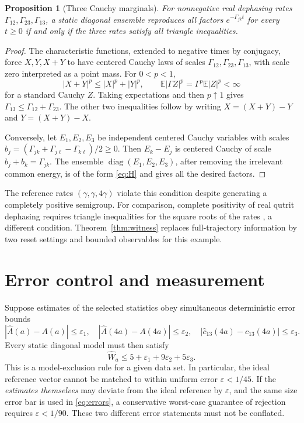 \documentclass[11pt,a4paper]{article}
\newtheorem{proposition}[theorem]{Proposition}
\newcommand{\E}{\mathbb E}
\newcommand{\diag}{\operatorname{diag}}
\begin{document}
\begin{proposition}[Three Cauchy marginals]
For nonnegative real dephasing rates
$\Gamma_{12},\Gamma_{23},\Gamma_{13}$, a static diagonal ensemble
reproduces all factors $e^{-\Gamma_{jk}t}$ for every $t\geq0$ if
and only if the three rates satisfy all triangle inequalities.
\end{proposition}
\begin{proof}
The characteristic functions, extended to negative times by conjugacy,
force $X,Y,X+Y$ to have centered Cauchy laws of scales
$\Gamma_{12},\Gamma_{23},\Gamma_{13}$, with scale zero interpreted
as a point mass. For $0<p<1$,
\[
 |X+Y|^p\leq|X|^p+|Y|^p,
 \qquad \E|\Gamma Z|^p=\Gamma^p\E|Z|^p<\infty
\]
for a standard Cauchy $Z$. Taking expectations and then $p\uparrow1$
gives $\Gamma_{13}\leq\Gamma_{12}+\Gamma_{23}$. The other two
inequalities follow by writing $X=(X+Y)-Y$ and $Y=(X+Y)-X$.

Conversely, let $E_1,E_2,E_3$ be independent centered Cauchy
variables with scales
$b_j=(\Gamma_{jk}+\Gamma_{j\ell}-\Gamma_{k\ell})/2\geq0$.
Then $E_k-E_j$ is centered Cauchy of scale
$b_j+b_k=\Gamma_{jk}$. The ensemble $\diag(E_1,E_2,E_3)$,
after removing the irrelevant common energy, is of the form
\eqref{eq:H} and gives all the desired factors.
\end{proof}

The reference rates $(\gamma,\gamma,4\gamma)$ violate this
condition despite generating a completely positive semigroup.
For comparison, complete positivity of real qutrit dephasing requires
triangle inequalities for the square roots of the rates
\cite{schirmer}, a different condition.
Theorem~\ref{thm:witness} replaces full-trajectory information by
two reset settings and bounded observables for this example.

\section{Error control and measurement}
Suppose estimates of the selected statistics obey simultaneous
deterministic error bounds
\[
 |\widehat A(a)-A(a)|\leq\varepsilon_1,\quad
 |\widehat A(4a)-A(4a)|\leq\varepsilon_2,\quad
 |\widehat c_{13}(4a)-c_{13}(4a)|\leq\varepsilon_3.
\]
Every static diagonal model must then satisfy
\begin{equation}\label{eq:errors}
 \widehat W_a\leq5+\varepsilon_1+9\varepsilon_2+5\varepsilon_3.
\end{equation}
This is a model-exclusion rule for a given data set. In particular,
the ideal reference vector cannot be matched to within uniform
error $\varepsilon<1/45$. If the \emph{estimates themselves} may
deviate from the ideal reference by $\varepsilon$, and the same
size error bar is used in \eqref{eq:errors}, a conservative
worst-case guarantee of rejection requires $\varepsilon<1/90$.
These two different error statements must not be conflated.
\end{document}
